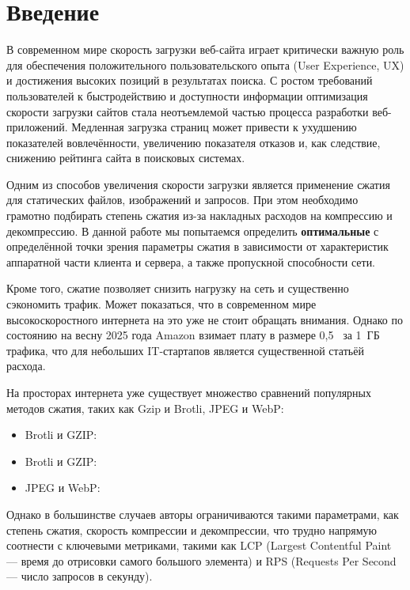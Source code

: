 \documentclass[12pt]{article}
\begin{document}
\tableofcontents

\newpage

\section{Введение}

В современном мире скорость загрузки веб-сайта играет критически важную роль для обеспечения положительного пользовательского опыта (User Experience, UX)
и достижения высоких позиций в результатах поиска. С ростом требований пользователей к быстродействию и доступности информации оптимизация скорости
загрузки сайтов стала неотъемлемой частью процесса разработки веб-приложений. Медленная загрузка страниц может привести к ухудшению показателей вовлечённости,
увеличению показателя отказов и, как следствие, снижению рейтинга сайта в поисковых системах.

Одним из способов увеличения скорости загрузки является применение сжатия для статических файлов, изображений и запросов.
При этом необходимо грамотно подбирать степень сжатия из-за накладных расходов на компрессию и декомпрессию.
В данной работе мы попытаемся определить \textbf{оптимальные} с определённой точки зрения параметры сжатия в зависимости от характеристик аппаратной части клиента и сервера,
а также пропускной способности сети.

Кроме того, сжатие позволяет снизить нагрузку на сеть и существенно сэкономить трафик.
Может показаться, что в современном мире высокоскоростного интернета на это уже не стоит обращать внимания.
Однако по состоянию на весну 2025 года Amazon \cite{aws-cloudwatch} взимает
плату в размере 0{,}5~\text{\$} за 1~ГБ трафика, что для небольших IT-стартапов является существенной статьёй расхода.

На просторах интернета уже существует множество сравнений популярных методов сжатия, таких как Gzip и Brotli, JPEG и WebP:

\begin{itemize}
    \item Brotli и GZIP: \cite{brotli-vs-gzip}
    \item Brotli и GZIP: \cite{brotli-ddosguard}
    \item JPEG и WebP: \cite{webp-vs-jpeg}
\end{itemize}

Однако в большинстве случаев авторы ограничиваются такими параметрами, как степень сжатия, скорость компрессии и декомпрессии,
что трудно напрямую соотнести с ключевыми метриками, такими как LCP (Largest Contentful Paint — время до отрисовки самого большого элемента)
и RPS (Requests Per Second — число запросов в секунду).
\end{document}
